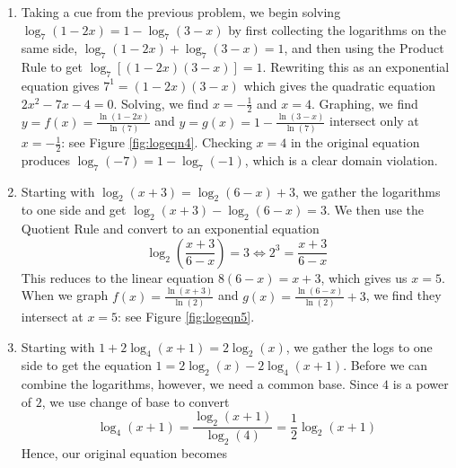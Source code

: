 {\begin{enumerate}
{}

\item  Taking a cue from the previous problem, we begin solving $\log_{7}(1-2x) = 1 - \log_{7}(3-x)$ by first collecting the logarithms on the same side, $\log_{7}(1-2x) +  \log_{7}(3-x) = 1$, and then using the Product Rule to get $\log_{7}[(1-2x)(3-x)] = 1$.  Rewriting this as an exponential equation gives $7^{1} = (1-2x)(3-x)$ which gives the quadratic equation $2x^2-7x-4=0$.  Solving, we find  $x = -\frac{1}{2}$ and $x=4$.  Graphing, we find $y = f(x) = \frac{\ln(1-2x)}{\ln(7)}$ and $y=g(x) = 1 - \frac{\ln(3-x)}{\ln(7)}$ intersect only at $x=-\frac{1}{2}$: see Figure \ref{fig:logeqn4}.  Checking $x=4$ in the original equation produces $\log_{7}(-7) = 1 - \log_{7}(-1)$, which is a clear domain violation.

{}

\item Starting with  $\log_{2}(x+3) = \log_{2}(6-x)+3$, we gather the logarithms to one side and get $\log_{2}(x+3) - \log_{2}(6-x) = 3$.  We then use the Quotient Rule and convert to an exponential equation \[\log_{2}\left(\frac{x+3}{6-x}\right) = 3 \iff 2^{3} = \frac{x+3}{6-x} \] This reduces to the linear equation $8(6-x) = x+3$, which gives us $x = 5$.  When we graph $f(x) = \frac{\ln(x+3)}{\ln(2)}$ and $g(x) =  \frac{\ln(6-x)}{\ln(2)} + 3$, we find they intersect at $x=5$: see Figure \ref{fig:logeqn5}.

{}

\item Starting with $1 + 2 \log_{4}(x+1) = 2 \log_{2}(x)$, we gather the logs to one side to get the equation $1 = 2 \log_{2}(x) - 2 \log_{4}(x+1)$.  Before we can combine the logarithms, however, we need a common base.  Since $4$ is a power of $2$, we use change of base to convert  \[\log_{4}(x+1) = \frac{\log_{2}(x+1)}{\log_{2}(4)} = \frac{1}{2} \log_{2}(x+1)\] Hence, our original equation becomes  


\end{enumerate}}
